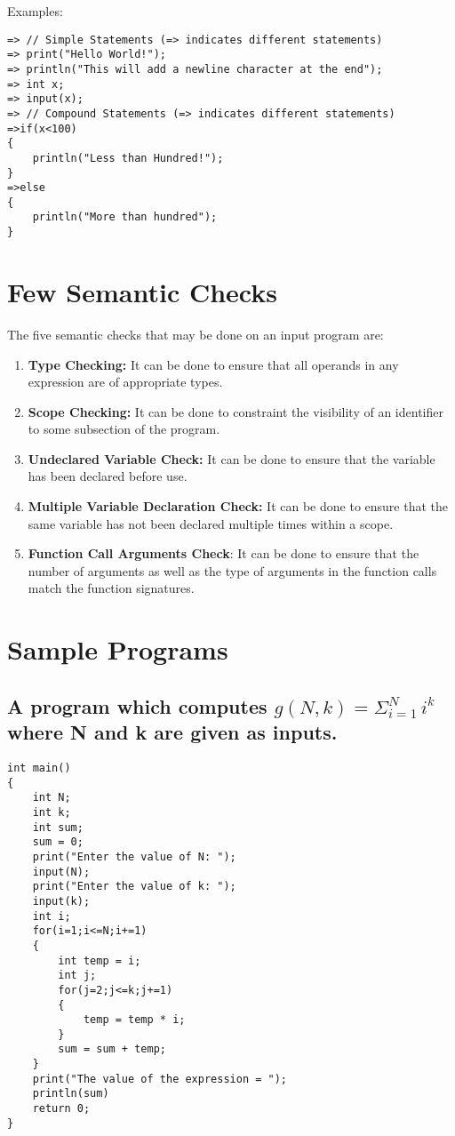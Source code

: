 \documentclass[12pt, a4paper]{article}
\begin{document}
				\vspace{8mm}
				Examples:
\begin{lstlisting}
=> // Simple Statements (=> indicates different statements)
=> print("Hello World!"); 
=> println("This will add a newline character at the end");
=> int x;
=> input(x);
=> // Compound Statements (=> indicates different statements)
=>if(x<100)
{
	println("Less than Hundred!");
}
=>else
{
	println("More than hundred");
}
\end{lstlisting} 			
\vspace{5mm}

	\section{Few Semantic Checks}
		The five semantic checks that may be done on an input program are:
		\begin{enumerate}
			\item \textbf{Type Checking:} It can be done to ensure that all operands in any expression are of appropriate types.
			\item \textbf{Scope Checking:} It can be done to constraint  the  visibility  of  an  identifier  to  some  subsection  of  the  program. 
			\item \textbf{Undeclared Variable Check:} It can be done to ensure that the variable has been declared before use.
			\item \textbf{Multiple Variable Declaration Check:} It can be done to ensure that the same variable has not been declared multiple times within a scope.
			\item \textbf{Function Call Arguments Check}: It can be done to ensure that the number of arguments as well as the type of arguments in the function calls match the function signatures. \\
		\end{enumerate}
	
	\section{Sample Programs}
	
		\subsection[Program 1]{A program which computes $ g(N,k) = \Sigma _{i=1} ^{N} \,i^k$ where N and k are given as inputs.}
\begin{lstlisting}
int main()
{
	int N;
	int k;
	int sum;
	sum = 0;
	print("Enter the value of N: ");
	input(N);
	print("Enter the value of k: ");
	input(k);
	int i;
	for(i=1;i<=N;i+=1) 
	{
		int temp = i;
		int j;
		for(j=2;j<=k;j+=1) 
		{
			temp = temp * i;
		}
		sum = sum + temp;
	} 
	print("The value of the expression = ");
	println(sum)
	return 0;
}
\end{lstlisting}
\end{document}
